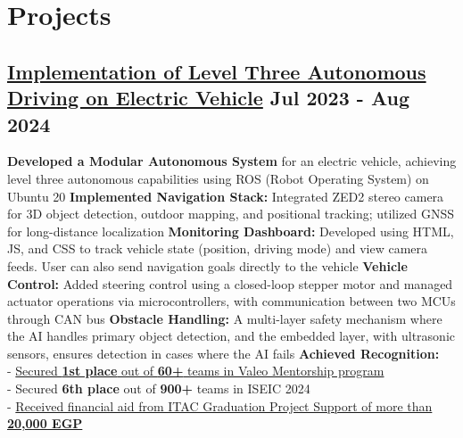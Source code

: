 \section*{Projects}
%
%
%
\subsection*{
  \href{https://github.com/Bumbleboss/autonomous-vehicle/}{Implementation of Level Three Autonomous Driving on Electric Vehicle}
  \hspace*{\fill}
  \dateformat Jul 2023 - Aug 2024
}
\begin{tasks}
  \task \textbf{Developed a Modular Autonomous System} for an electric vehicle, achieving level three autonomous capabilities using ROS (Robot Operating System) on Ubuntu 20
  \task \textbf{Implemented Navigation Stack:} Integrated ZED2 stereo camera for 3D object detection, outdoor mapping, and positional tracking; utilized GNSS for long-distance localization
  \task \textbf{Monitoring Dashboard:} Developed using HTML, JS, and CSS to track vehicle state (position, driving mode) and view camera feeds. User can also send navigation goals directly to the vehicle
  \task \textbf{Vehicle Control:} Added steering control using a closed-loop stepper motor and managed actuator operations via microcontrollers, with communication between two MCUs through CAN bus
  \task \textbf{Obstacle Handling:} A multi-layer safety mechanism where the AI handles primary object detection, and the embedded layer, with ultrasonic sensors, ensures detection in cases where the AI fails
  \task \textbf{Achieved Recognition:}\\
    - \href{https://www.linkedin.com/feed/update/urn:li:activity:7230237292680933376/}{Secured \textbf{1st place} out of \textbf{60+} teams in Valeo Mentorship program}\\
    - Secured \textbf{6th place} out of \textbf{900+} teams in ISEIC 2024\\
    - \href{https://itida.gov.eg/English/Programs/Graduation/Documents/List-of-Accepted-Graduation-Projects-Round-19-new.pdf}{Received financial aid from ITAC Graduation Project Support of more than \textbf{20,000 EGP}}
\end{tasks}
%
%

